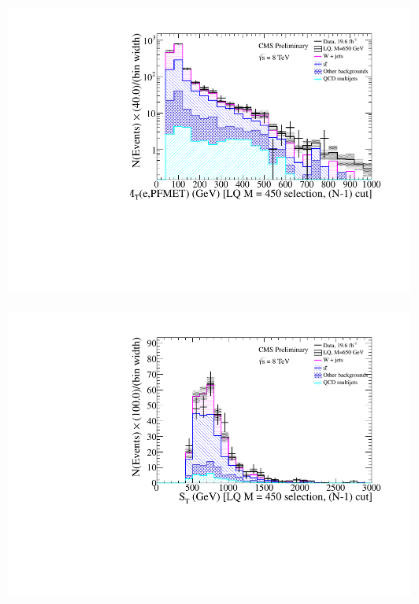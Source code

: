\documentclass[bigger]{beamer}
\begin{document}
\begin{frame}
\begin{columns}
\begin{column}{0.55\textwidth}
\centering
\includegraphics[width=0.8\textwidth]{fig/enu/nMinus1/MTenu_stAndMetAndMejLQ450_enujj.pdf}
\label{sec-1-13-1-1-2-2}

\centering
\includegraphics[width=0.8\textwidth]{fig/enu/nMinus1/ST_mtAndMetAndMejLQ450_enujj.pdf}
\end{column}
\end{columns}
\end{frame}
\end{document}
